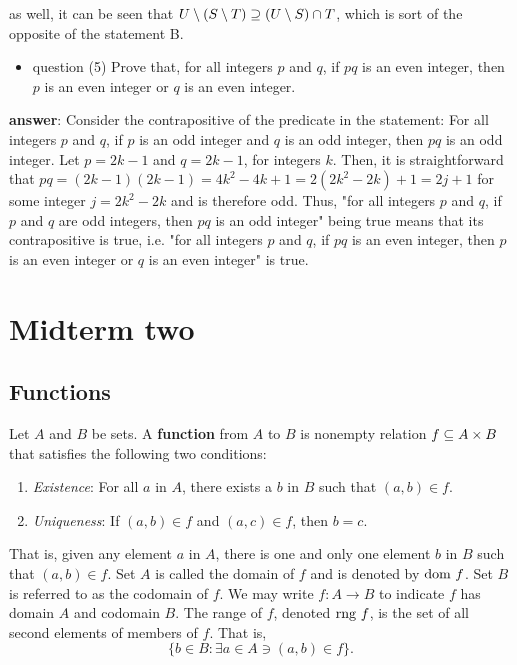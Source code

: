 \documentclass[12pt]{article}
\begin{document}
as well, it can be seen that \(U\setminus(S\setminus{}T)\supseteq(U\setminus{}S)\cap{}T\), which is sort of the opposite of
the statement B.
\begin{itemize}
\item question (5) Prove that, for all integers \(p\) and \(q\), if \(pq\) is an even
integer, then \(p\) is an even integer or \(q\) is an even integer.
\end{itemize}
\textbf{answer}: Consider the contrapositive of the predicate in the statement: For all
integers \(p\) and \(q\), if \(p\) is an odd integer and \(q\) is an odd integer, then
\(pq\) is an odd integer. Let \(p=2k-1\) and \(q=2k-1\), for integers \(k\). Then, it is
straightforward that \(pq=(2k-1)(2k-1)=4k^{2}-4k+1=2(2k^{2}-2k)+1=2j+1\) for some
integer \(j=2k^{2}-2k\) and is therefore odd. Thus, "for all integers \(p\) and \(q\), if
\(p\) and \(q\) are odd integers, then \(pq\) is an odd integer" being true means that
its contrapositive is true, i.e. "for all integers \(p\) and \(q\), if \(pq\) is an
even integer, then \(p\) is an even integer or \(q\) is an even integer" is true.

\section{Midterm two}
\label{sec:orgc319b3f}
\subsection{Functions}
\label{sec:orgdc160f5}
\begin{definition}[Function]
  Let $A$ and $B$ be sets. A \textbf{function} from $A$ to $B$ is nonempty relation
  $f \subseteq A \times B$ that satisfies the following two conditions:
  \begin{enumerate}
  \item \textit{Existence}: For all $a$ in $A$, there exists a $b$ in $B$ such
    that $(a, b) \in f$.
  \item \textit{Uniqueness}: If $(a,b) \in f$ and $(a, c) \in f$, then $b = c$.
  \end{enumerate}

  That is, given any element $a$ in $A$, there is one and only one element $b$
  in $B$ such  that $(a, b) \in f$. Set  $A$ is called the domain of  $f$ and is
  denoted by $\text{dom }f$.  Set $B$ is referred to as the codomain  of $f$. We may
  write $f : A \rightarrow B$ to indicate $f$ has domain $A$ and codomain $B$. The range
  of $f$, denoted  $\text{rng }f$, is the  set of all second elements  of members of
  $f$. That is, $$\{ b \in B : \exists a \in A \ni (a,b) \in f \}.$$
\end{definition}
\end{document}
